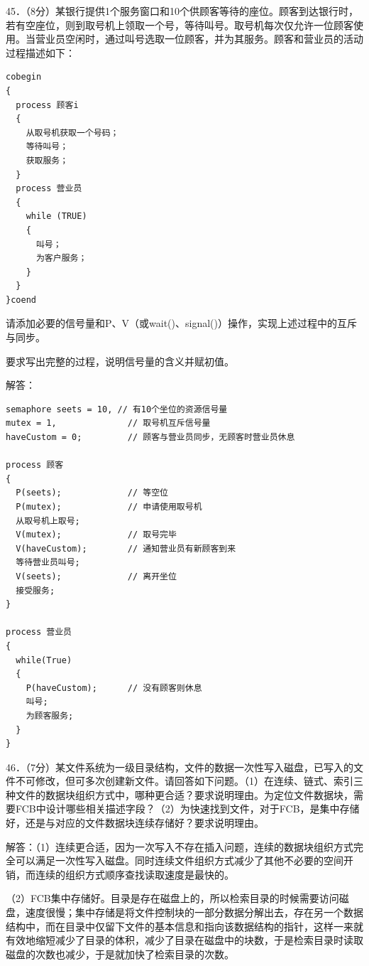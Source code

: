 \documentclass[UTF8,11pt]{ctexart}
\begin{document}
45．（8分）某银行提供1个服务窗口和10个供顾客等待的座位。顾客到达银行时，若有空座位，则到取号机上领取一个号，等待叫号。取号机每次仅允许一位顾客使用。当营业员空闲时，通过叫号选取一位顾客，并为其服务。顾客和营业员的活动过程描述如下：


\begin{Verbatim}[breaklines,breakanywhere,fontsize=\small]
cobegin
{
  process 顾客i
  {
    从取号机获取一个号码；
    等待叫号；
    获取服务；
  }
  process 营业员
  {
    while (TRUE)
    {
      叫号；
      为客户服务；
    }
  }
}coend
\end{Verbatim}

请添加必要的信号量和P、V（或wait()、signal()）操作，实现上述过程中的互斥与同步。


要求写出完整的过程，说明信号量的含义并赋初值。


解答：


\begin{Verbatim}[breaklines,breakanywhere,fontsize=\small]
semaphore seets = 10, // 有10个坐位的资源信号量
mutex = 1,              // 取号机互斥信号量
haveCustom = 0;         // 顾客与营业员同步，无顾客时营业员休息

process 顾客
{
  P(seets);             // 等空位
  P(mutex);             // 申请使用取号机
  从取号机上取号;
  V(mutex);             // 取号完毕
  V(haveCustom);        // 通知营业员有新顾客到来
  等待营业员叫号;
  V(seets);             // 离开坐位
  接受服务;
}

process 营业员
{
  while(True)
  {
    P(haveCustom);      // 没有顾客则休息
    叫号;
    为顾客服务;
  }
}
\end{Verbatim}

46．（7分）某文件系统为一级目录结构，文件的数据一次性写入磁盘，已写入的文件不可修改，但可多次创建新文件。请回答如下问题。（1）在连续、链式、索引三种文件的数据块组织方式中，哪种更合适？要求说明理由。为定位文件数据块，需要FCB中设计哪些相关描述字段？（2）为快速找到文件，对于FCB，是集中存储好，还是与对应的文件数据块连续存储好？要求说明理由。


解答：（1）连续更合适，因为一次写入不存在插入问题，连续的数据块组织方式完全可以满足一次性写入磁盘。同时连续文件组织方式减少了其他不必要的空间开销，而连续的组织方式顺序查找读取速度是最快的。


（2）FCB集中存储好。目录是存在磁盘上的，所以检索目录的时候需要访问磁盘，速度很慢；集中存储是将文件控制块的一部分数据分解出去，存在另一个数据结构中，而在目录中仅留下文件的基本信息和指向该数据结构的指针，这样一来就有效地缩短减少了目录的体积，减少了目录在磁盘中的块数，于是检索目录时读取磁盘的次数也减少，于是就加快了检索目录的次数。
\end{document}
